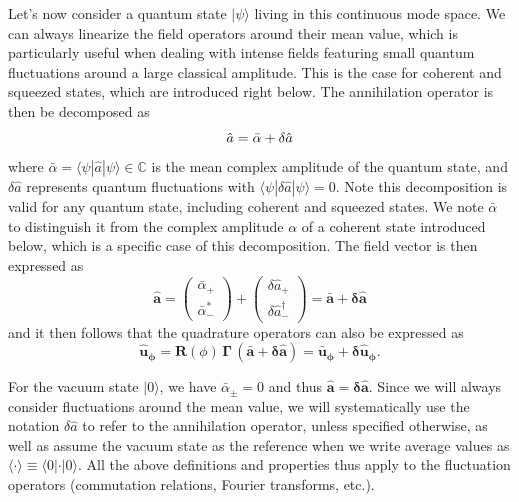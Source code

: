 Let's now consider a quantum state $| \psi \rangle$ living in this continuous mode space. We can always linearize the field operators around their mean value, which is particularly useful when dealing with intense fields featuring small quantum fluctuations around a large classical amplitude. This is the case for coherent and squeezed states, which are introduced right below. The annihilation operator is then be decomposed as
\begin{equation}
    \hat{a}  = \bar{\alpha} + \delta\hat{a} \\
\label{II.8}
\end{equation}
where \( \bar{\alpha} = \langle \psi |\hat{a} |\psi \rangle \in \mathbb{C}\) is the mean complex amplitude of the quantum state, and \(\delta\hat{a}\) represents quantum fluctuations with \(\langle \psi | \delta\hat{a}| \psi \rangle = 0\). Note this decomposition is valid for any quantum state, including coherent and squeezed states. We note $\bar{\alpha}$ to distinguish it from the complex amplitude $\alpha$ of a coherent state introduced below, which is a specific case of this decomposition. The field vector is then expressed as
\begin{equation}
\mathbf{\hat{a}} =  \begin{pmatrix} \bar{\alpha}_+  \\ \bar{\alpha}_-^*  \end{pmatrix} + \begin{pmatrix} \delta\hat{a}_+ \\ \delta\hat{a}_-^\dagger \end{pmatrix} =  \mathbf{\bar{a}} + \mathbf{\delta \hat{a}}
\end{equation}
and it then follows that the quadrature operators can also be expressed as
\begin{equation}
    \mathbf{\hat{u}_\phi}  = \mathbf{R}(\phi) \, \mathbf\Gamma  \,(\mathbf{\bar{a}} + \mathbf{\delta \hat{a}})  = \mathbf{\bar{u}_\phi}  + \mathbf{\delta \hat{u}_\phi}. 
\end{equation}

For the vacuum state \(|0\rangle\), we have \(\bar{\alpha}_\pm = 0\) and thus \(\mathbf{\hat{a}} = \mathbf{\delta \hat{a}}\). Since we will always consider fluctuations around the mean value, we will systematically use the notation \(\delta\hat{a}\) to refer to the annihilation operator, unless specified otherwise, as well as assume the vacuum state as the reference when we write average values as \(\langle \cdot \rangle \equiv \langle 0 | \cdot | 0 \rangle\). All the above definitions and properties thus apply to the fluctuation operators (commutation relations, Fourier transforms, etc.).

